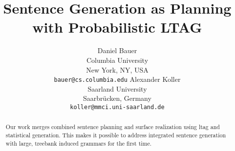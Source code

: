 \documentclass[11pt,letterpaper]{article}
\title{Sentence Generation as Planning with Probabilistic LTAG\\
}
\author{Daniel Bauer\\
  Columbia University\\
  New York, NY, USA\\
  {\tt bauer@cs.columbia.edu} 
  \And
  Alexander Koller\\
  Saarland University\\
  Saarbr\"{u}cken, Germany\\ 
  {\tt koller@mmci.uni-saarland.de}}
\date{}
\begin{document}
\maketitle
\begin{abstract}
Our work merges combined sentence planning and surface realization using 
{\sc ltag} and statistical generation. This makes it possible to address
integrated sentence generation with large, treebank induced grammars for
the first time.
\end{abstract}






\end{document}
